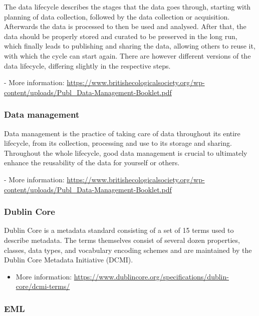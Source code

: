 \documentclass[
]{book}
\providecommand{\tightlist}{%
  \setlength{\itemsep}{0pt}\setlength{\parskip}{0pt}}
\begin{document}
The data lifecycle describes the stages that the data goes through, starting with planning of data collection, followed by the data collection or acquisition. Afterwards the data is processed to then be used and analysed. After that, the data should be properly stored and curated to be preserved in the long run, which finally leads to publishing and sharing the data, allowing others to reuse it, with which the cycle can start again. There are however different versions of the data lifecycle, differing slightly in the respective steps.

{- More information: \url{https://www.britishecologicalsociety.org/wp-content/uploads/Publ_Data-Management-Booklet.pdf}}

\hypertarget{datamanagement}{%
\subsubsection*{Data management}\label{datamanagement}}

Data management is the practice of taking care of data throughout its entire lifecycle, from its collection, processing and use to its storage and sharing. Throughout the whole lifecycle, good data management is crucial to ultimately enhance the reusability of the data for yourself or others.

{- More information: \url{https://www.britishecologicalsociety.org/wp-content/uploads/Publ_Data-Management-Booklet.pdf}}

\hypertarget{dublincore}{%
\subsubsection*{Dublin Core}\label{dublincore}}

Dublin Core is a metadata standard consisting of a set of 15 terms used to describe metadata. The terms themselves consist of several dozen properties, classes, data types, and vocabulary encoding schemes and are maintained by the Dublin Core Metadata Initiative (DCMI).

\begin{itemize}
\tightlist
\item
  More information: \url{https://www.dublincore.org/specifications/dublin-core/dcmi-terms/}
\end{itemize}

\hypertarget{eml}{%
\subsubsection*{EML}\label{eml}}
\end{document}
